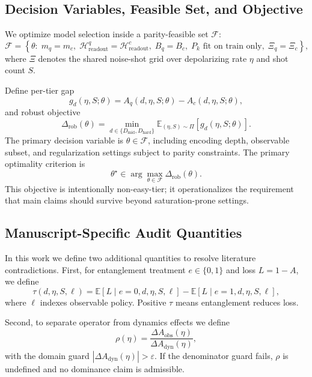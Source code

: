 \documentclass{article} %
\begin{document}
\subsection{Decision Variables, Feasible Set, and Objective}
We optimize model selection inside a parity-feasible set $\mathcal{F}$:
\begin{equation}
\label{eq:feasible_set}
\mathcal{F}=\left\{\theta:\;m_q=m_c,\;\mathcal{H}_{\mathrm{readout}}^q=\mathcal{H}_{\mathrm{readout}}^c,\;B_q=B_c,\;P_k \text{ fit on train only},\;\Xi_q=\Xi_c\right\},
\end{equation}
where $\Xi$ denotes the shared noise-shot grid over depolarizing rate $\eta$ and shot count $S$.

Define per-tier gap
\begin{equation}
\label{eq:gap}
g_d(\eta,S;\theta)=A_q(d,\eta,S;\theta)-A_c(d,\eta,S;\theta),
\end{equation}
and robust objective
\begin{equation}
\label{eq:robust_obj}
\Delta_{\mathrm{rob}}(\theta)=\min_{d\in\{D_{\mathrm{mid}},D_{\mathrm{hard}}\}}\mathbb{E}_{(\eta,S)\sim\Pi}\left[g_d(\eta,S;\theta)\right].
\end{equation}
The primary decision variable is $\theta\in\mathcal{F}$, including encoding depth, observable subset, and regularization settings subject to parity constraints. The primary optimality criterion is
\begin{equation}
\label{eq:argmax}
\theta^{\star}\in\arg\max_{\theta\in\mathcal{F}}\Delta_{\mathrm{rob}}(\theta).
\end{equation}
This objective is intentionally non-easy-tier; it operationalizes the requirement that main claims should survive beyond saturation-prone settings.

\subsection{Manuscript-Specific Audit Quantities}
In this work we define two additional quantities to resolve literature contradictions.
First, for entanglement treatment $e\in\{0,1\}$ and loss $L=1-A$, we define
\begin{equation}
\label{eq:tau}
\tau(d,\eta,S,\ell)=\mathbb{E}[L\mid e=0,d,\eta,S,\ell]-\mathbb{E}[L\mid e=1,d,\eta,S,\ell],
\end{equation}
where $\ell$ indexes observable policy. Positive $\tau$ means entanglement reduces loss.

Second, to separate operator from dynamics effects we define
\begin{equation}
\label{eq:rho}
\rho(\eta)=\frac{\Delta A_{\mathrm{obs}}(\eta)}{\Delta A_{\mathrm{dyn}}(\eta)},
\end{equation}
with the domain guard $|\Delta A_{\mathrm{dyn}}(\eta)|>\varepsilon$. If the denominator guard fails, $\rho$ is undefined and no dominance claim is admissible.
\end{document}
